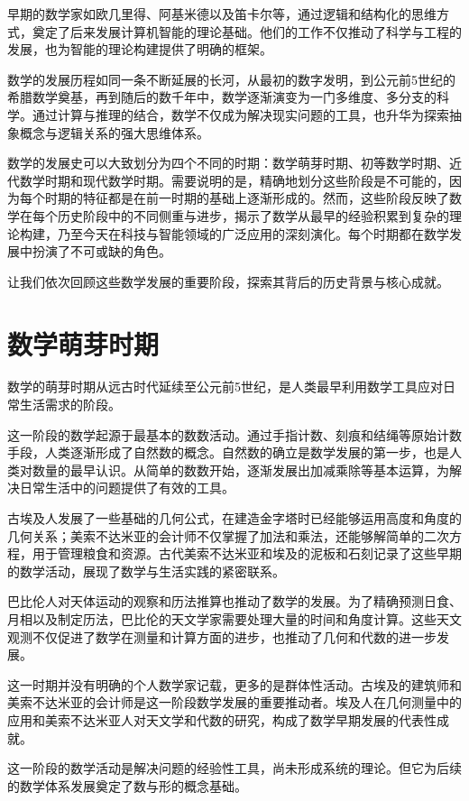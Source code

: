 早期的数学家如欧几里得、阿基米德以及笛卡尔等，通过逻辑和结构化的思维方式，奠定了后来发展计算机智能的理论基础。他们的工作不仅推动了科学与工程的发展，也为智能的理论构建提供了明确的框架。

数学的发展历程如同一条不断延展的长河，从最初的数字发明，到公元前5世纪的希腊数学奠基，再到随后的数千年中，数学逐渐演变为一门多维度、多分支的科学。通过计算与推理的结合，数学不仅成为解决现实问题的工具，也升华为探索抽象概念与逻辑关系的强大思维体系。

数学的发展史可以大致划分为四个不同的时期：数学萌芽时期、初等数学时期、近代数学时期和现代数学时期。需要说明的是，精确地划分这些阶段是不可能的，因为每个时期的特征都是在前一时期的基础上逐渐形成的。然而，这些阶段反映了数学在每个历史阶段中的不同侧重与进步，揭示了数学从最早的经验积累到复杂的理论构建，乃至今天在科技与智能领域的广泛应用的深刻演化。每个时期都在数学发展中扮演了不可或缺的角色。

让我们依次回顾这些数学发展的重要阶段，探索其背后的历史背景与核心成就。

\section{数学萌芽时期}
数学的萌芽时期从远古时代延续至公元前5世纪，是人类最早利用数学工具应对日常生活需求的阶段。

这一阶段的数学起源于最基本的数数活动。通过手指计数、刻痕和结绳等原始计数手段，人类逐渐形成了自然数的概念。自然数的确立是数学发展的第一步，也是人类对数量的最早认识。从简单的数数开始，逐渐发展出加减乘除等基本运算，为解决日常生活中的问题提供了有效的工具。

古埃及人发展了一些基础的几何公式，在建造金字塔时已经能够运用高度和角度的几何关系；美索不达米亚的会计师不仅掌握了加法和乘法，还能够解简单的二次方程，用于管理粮食和资源。古代美索不达米亚和埃及的泥板和石刻记录了这些早期的数学活动，展现了数学与生活实践的紧密联系。

巴比伦人对天体运动的观察和历法推算也推动了数学的发展。为了精确预测日食、月相以及制定历法，巴比伦的天文学家需要处理大量的时间和角度计算。这些天文观测不仅促进了数学在测量和计算方面的进步，也推动了几何和代数的进一步发展。

这一时期并没有明确的个人数学家记载，更多的是群体性活动。古埃及的建筑师和美索不达米亚的会计师是这一阶段数学发展的重要推动者。埃及人在几何测量中的应用和美索不达米亚人对天文学和代数的研究，构成了数学早期发展的代表性成就。

这一阶段的数学活动是解决问题的经验性工具，尚未形成系统的理论。但它为后续的数学体系发展奠定了数与形的概念基础。

